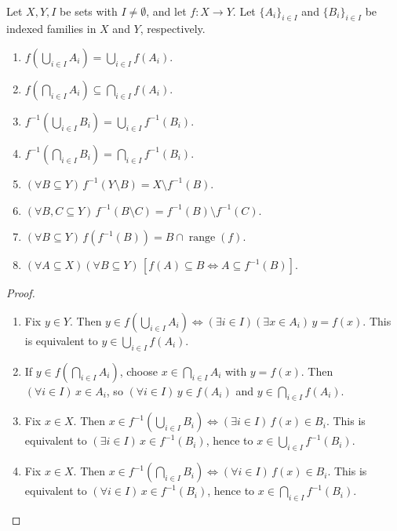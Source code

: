 \begin{proposition} \label{prop:image-preimage-calculus} \\
Let $X,Y,I$ be sets with $I\neq\emptyset$, and let $f:X\to Y$. Let $\{A_i\}_{i\in I}$ and $\{B_i\}_{i\in I}$ be indexed families in $X$ and $Y$, respectively.
\begin{enumerate}[label=(\roman*)]
\setlength{\itemsep}{0pt}
\item $f\left(\bigcup\limits_{i\in I}A_i\right)=\bigcup\limits_{i\in I}f(A_i)$.
\item $f\left(\bigcap\limits_{i\in I}A_i\right)\subseteq\bigcap\limits_{i\in I}f(A_i)$.
\item $f^{-1}\left(\bigcup\limits_{i\in I}B_i\right)=\bigcup\limits_{i\in I}f^{-1}(B_i)$.
\item $f^{-1}\left(\bigcap\limits_{i\in I}B_i\right)=\bigcap\limits_{i\in I}f^{-1}(B_i)$.
\item $(\forall B\subseteq Y)\,f^{-1}(Y\setminus B)=X\setminus f^{-1}(B)$.
\item $(\forall B,C\subseteq Y)\,f^{-1}(B\setminus C)=f^{-1}(B)\setminus f^{-1}(C)$.
\item $(\forall B\subseteq Y)\,f(f^{-1}(B))=B\cap\operatorname{range}(f)$.
\item $(\forall A\subseteq X)(\forall B\subseteq Y)\,[f(A)\subseteq B\Longleftrightarrow A\subseteq f^{-1}(B)]$.
\end{enumerate}
\begin{proof}
\begin{enumerate}[label=(\roman*)]
\setlength{\itemsep}{0pt}
\item Fix $y\in Y$. Then $y\in f\left(\bigcup\limits_{i\in I}A_i\right)\Longleftrightarrow(\exists i\in I)(\exists x\in A_i)\,y=f(x)$. This is equivalent to $y\in\bigcup\limits_{i\in I}f(A_i)$.
\item If $y\in f\left(\bigcap\limits_{i\in I}A_i\right)$, choose $x\in\bigcap\limits_{i\in I}A_i$ with $y=f(x)$. Then $(\forall i\in I)\,x\in A_i$, so $(\forall i\in I)\,y\in f(A_i)$ and $y\in\bigcap\limits_{i\in I}f(A_i)$.
\item Fix $x\in X$. Then $x\in f^{-1}\left(\bigcup\limits_{i\in I}B_i\right)\Longleftrightarrow(\exists i\in I)\,f(x)\in B_i$. This is equivalent to $(\exists i\in I)\,x\in f^{-1}(B_i)$, hence to $x\in\bigcup\limits_{i\in I}f^{-1}(B_i)$.
\item Fix $x\in X$. Then $x\in f^{-1}\left(\bigcap\limits_{i\in I}B_i\right)\Longleftrightarrow(\forall i\in I)\,f(x)\in B_i$. This is equivalent to $(\forall i\in I)\,x\in f^{-1}(B_i)$, hence to $x\in\bigcap\limits_{i\in I}f^{-1}(B_i)$.

\end{enumerate}
\end{proof}
\end{proposition}
